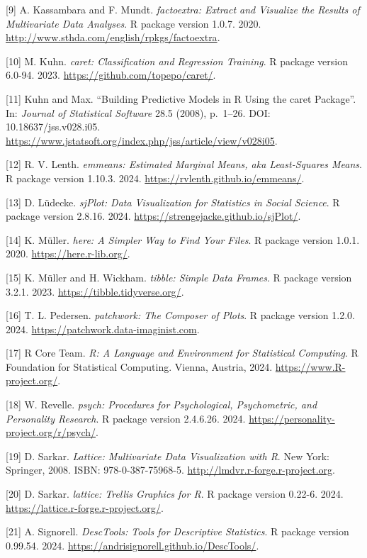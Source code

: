 \documentclass[
  letterpaper,
  DIV=11,
  numbers=noendperiod]{scrreprt}
\begin{document}
{[}9{]} A. Kassambara and F. Mundt. \emph{factoextra: Extract and
Visualize the Results of Multivariate Data Analyses}. R package version
1.0.7. 2020. \url{http://www.sthda.com/english/rpkgs/factoextra}.

{[}10{]} M. Kuhn. \emph{caret: Classification and Regression Training}.
R package version 6.0-94. 2023. \url{https://github.com/topepo/caret/}.

{[}11{]} Kuhn and Max. ``Building Predictive Models in R Using the caret
Package''. In: \emph{Journal of Statistical Software} 28.5 (2008),
p.~1--26. DOI: 10.18637/jss.v028.i05.
\url{https://www.jstatsoft.org/index.php/jss/article/view/v028i05}.

{[}12{]} R. V. Lenth. \emph{emmeans: Estimated Marginal Means, aka
Least-Squares Means}. R package version 1.10.3. 2024.
\url{https://rvlenth.github.io/emmeans/}.

{[}13{]} D. Lüdecke. \emph{sjPlot: Data Visualization for Statistics in
Social Science}. R package version 2.8.16. 2024.
\url{https://strengejacke.github.io/sjPlot/}.

{[}14{]} K. Müller. \emph{here: A Simpler Way to Find Your Files}. R
package version 1.0.1. 2020. \url{https://here.r-lib.org/}.

{[}15{]} K. Müller and H. Wickham. \emph{tibble: Simple Data Frames}. R
package version 3.2.1. 2023. \url{https://tibble.tidyverse.org/}.

{[}16{]} T. L. Pedersen. \emph{patchwork: The Composer of Plots}. R
package version 1.2.0. 2024. \url{https://patchwork.data-imaginist.com}.

{[}17{]} R Core Team. \emph{R: A Language and Environment for
Statistical Computing}. R Foundation for Statistical Computing. Vienna,
Austria, 2024. \url{https://www.R-project.org/}.

{[}18{]} W. Revelle. \emph{psych: Procedures for Psychological,
Psychometric, and Personality Research}. R package version 2.4.6.26.
2024. \url{https://personality-project.org/r/psych/}.

{[}19{]} D. Sarkar. \emph{Lattice: Multivariate Data Visualization with
R}. New York: Springer, 2008. ISBN: 978-0-387-75968-5.
\url{http://lmdvr.r-forge.r-project.org}.

{[}20{]} D. Sarkar. \emph{lattice: Trellis Graphics for R}. R package
version 0.22-6. 2024. \url{https://lattice.r-forge.r-project.org/}.

{[}21{]} A. Signorell. \emph{DescTools: Tools for Descriptive
Statistics}. R package version 0.99.54. 2024.
\url{https://andrisignorell.github.io/DescTools/}.
\end{document}
